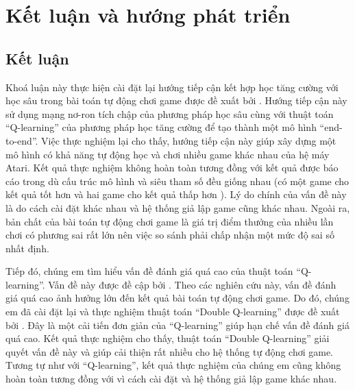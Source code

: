 \chapter{Kết luận và hướng phát triển}
\section{Kết luận}
	Khoá luận này thực hiện cài đặt lại hướng tiếp cận kết hợp học tăng cường với học sâu trong bài toán tự động chơi game được đề xuất bởi \cite{mnihdqn2015}.
	Hướng tiếp cận này sử dụng mạng nơ-ron tích chập của phương pháp học sâu cùng với thuật toán ``Q-learning'' của phương pháp học tăng cường để tạo thành một mô hình ``end-to-end''.
	Việc thực nghiệm lại cho thấy, hướng tiếp cận này giúp xây dựng một mô hình có khả năng tự động học và chơi nhiều game khác nhau của hệ máy Atari.
	Kết quả thực nghiệm không hoàn toàn tương đồng với kết quả được báo cáo trong \cite{mnihdqn2015} dù cấu trúc mô hình và siêu tham số đều giống nhau (có một game cho kết quả tốt hơn \cite{mnihdqn2015} và hai game cho kết quả thấp hơn \cite{mnihdqn2015}).
	Lý do chính của vấn đề này là do cách cài đặt khác nhau và hệ thống giả lập game cũng khác nhau.
	Ngoài ra, bản chất của bài toán tự động chơi game là giá trị điểm thưởng của nhiều lần chơi có phương sai rất lớn nên việc so sánh phải chấp nhận một mức độ sai số nhất định.
	
	Tiếp đó, chúng em tìm hiểu vấn đề đánh giá quá cao của thuật toán ``Q-learning''.
	Vấn đề này được đề cập bởi \cite{hasselt2010double, van2015deep}.
	Theo các nghiên cứu này, vấn đề đánh giá quá cao ảnh hưởng lớn đến kết quả bài toán tự động chơi game.
	Do đó, chúng em đã cài đặt lại và thực nghiệm thuật toán ``Double Q-learning'' được đề xuất bởi \cite{van2015deep}.
	Đây là một cải tiến đơn giản của ``Q-learning'' giúp hạn chế vấn đề đánh giá quá cao.
	Kết quả thực nghiệm cho thấy, thuật toán ``Double Q-learning'' giải quyết vấn đề này và giúp cải thiện 	rất nhiều cho hệ thống tự động chơi game.
	Tương tự như với ``Q-learning'', kết quả thực nghiệm của chúng em cũng không hoàn toàn tương đồng với \cite{van2015deep} vì cách cài đặt và hệ thống giả lập game khác nhau.

